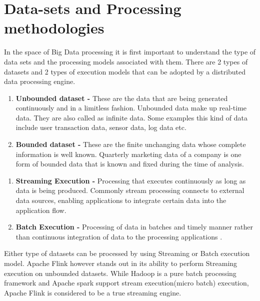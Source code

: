 \section{Data-sets and Processing methodologies}
In the space of Big Data processing it is first important to understand the type of data sets and the processing models associated with them. There are 2 types of datasets and 2 types of execution models that can be adopted by a distributed data processing engine. 
\begin{enumerate}
\item \textbf{Unbounded dataset - } These are the data that are being generated continuously and in a limitless fashion. Unbounded data make up real-time data. They are also called as infinite data. Some examples this kind of data include user transaction data, sensor data, log data etc.
\item \textbf{Bounded dataset - } These are the finite unchanging data whose complete information is well known. Quarterly marketing data of a company is one form of bounded data that is known and fixed during the time of analysis.
\end{enumerate}
\begin{enumerate}\item \textbf{Streaming Execution - } Processing that executes continuously as long as data is being produced. Commonly stream processing connects to external data sources, enabling applications to integrate certain data into the application flow.
\item \textbf{Batch Execution - } Processing of data in batches and timely manner rather than continuous integration of data to the processing applications \cite{Apache-Flink}. \end{enumerate}
Either type of datasets can be processed by using Streaming or Batch execution model. Apache Flink however stands out in its ability to perform Streaming execution on unbounded datasets. While Hadoop is a pure batch processing framework and Apache spark support stream execution(micro batch)  execution, Apache Flink is considered to be a true streaming engine.
